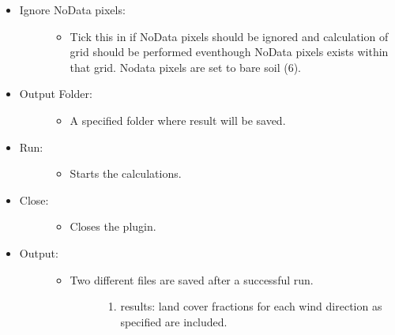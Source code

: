 \documentclass[letterpaper,10pt,english]{sphinxmanual}
\begin{document}
\begin{itemize}
\item {} \begin{description}
\item[{Ignore NoData pixels:}] \leavevmode\begin{itemize}
\item {} 
Tick this in if NoData pixels should be ignored and calculation of grid should be performed eventhough NoData pixels exists within that grid. Nodata pixels are set to bare soil (6).

\end{itemize}

\end{description}

\item {} \begin{description}
\item[{Output Folder:}] \leavevmode\begin{itemize}
\item {} 
A specified folder where result will be saved.

\end{itemize}

\end{description}

\item {} \begin{description}
\item[{Run:}] \leavevmode\begin{itemize}
\item {} 
Starts the calculations.

\end{itemize}

\end{description}

\item {} \begin{description}
\item[{Close:}] \leavevmode\begin{itemize}
\item {} 
Closes the plugin.

\end{itemize}

\end{description}

\item {} \begin{description}
\item[{Output:}] \leavevmode\begin{itemize}
\item {} \begin{description}
\item[{Two different files are saved after a successful run.}] \leavevmode\begin{enumerate}
\item {} 
 results: land cover fractions for each wind direction as specified are included.


\end{enumerate}
\end{description}
\end{itemize}
\end{description}
\end{itemize}
\end{document}
